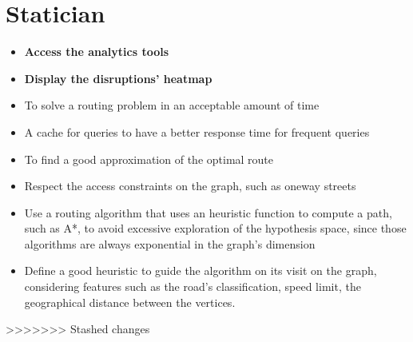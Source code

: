 \section{Statician}
\begin{itemize}
	\item \textbf{Access the analytics tools}
	\item \textbf{Display the disruptions' heatmap}
\end{itemize}

	\begin{itemize}
	\item To solve a routing problem in an acceptable amount of time
	\item A cache for queries to have a better response time for frequent queries
	\item To find a good approximation of the optimal route
	\item Respect the access constraints on the graph, such as oneway streets
	\item Use a routing algorithm that uses an heuristic function to compute a path, such as A*, to avoid excessive exploration of the hypothesis space, since those algorithms are always exponential in the graph’s dimension
	\item Define a good heuristic to guide the algorithm on its visit on the graph, considering features such as the road’s classification, speed limit, the geographical distance between the vertices.
	\end{itemize}
>>>>>>> Stashed changes





